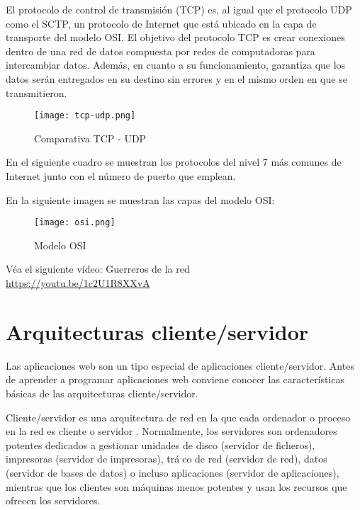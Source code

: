 \cite{wiki}El protocolo de control de transmisión (TCP) es, al igual que el protocolo UDP como el SCTP, un protocolo de Internet que está ubicado en la capa de transporte del modelo OSI. El objetivo del protocolo TCP es crear conexiones dentro de una red de datos compuesta por redes de computadoras para intercambiar datos. Además, en cuanto a su funcionamiento, garantiza que los datos serán entregados en su destino sin errores y en el mismo orden en que se transmitieron.

\begin{figure}[H]
	\center
	\texttt{[image: tcp-udp.png]}
	\caption{Comparativa TCP - UDP}
	\label{fig:super}
\end{figure}


En el siguiente cuadro se muestran los protocolos del nivel 7 más comunes de Internet
junto con el número de puerto que emplean.

\cite{osi}En la siguiente imagen se muestran las capas del modelo OSI:

\begin{figure}[H]
	\center
	\texttt{[image: osi.png]}
	\caption{Modelo OSI}
	\label{fig:super}
\end{figure}

\begin{remark}
Véa el siguiente vídeo: Guerreros de la red \\
\url{https://youtu.be/1c2U1R8XXvA}
\end{remark}

\section{Arquitecturas cliente/servidor} 

\cite{sl}Las aplicaciones web son un tipo especial de aplicaciones cliente/servidor. Antes de
aprender a programar aplicaciones web conviene conocer las características básicas de las
arquitecturas cliente/servidor.

Cliente/servidor es una arquitectura de red
en la que cada ordenador o proceso en
la red es cliente o servidor
. Normalmente, los servidores son ordenadores potentes
dedicados a gestionar unidades de disco (servidor de ficheros), impresoras (servidor de impresoras), tráco de red (servidor de red), datos (servidor de bases de datos) o
incluso aplicaciones (servidor de aplicaciones), mientras que los clientes son máquinas
menos potentes y usan los recursos que ofrecen los servidores.

